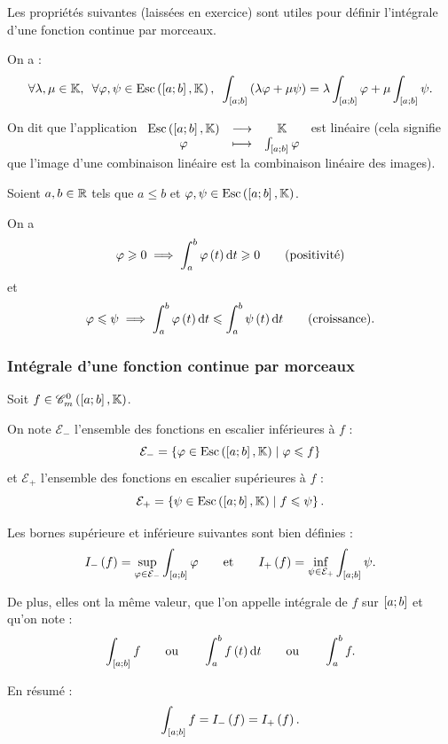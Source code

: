 \begin{rem}
Les propriétés suivantes (laissées en exercice) sont utiles pour définir l'intégrale d'une fonction continue par morceaux.
\end{rem}

\begin{prop}
On a : \[\quantifs{\forall\lambda,\mu\in\K;\forall\phi,\psi\in\Esc}\int_{\intervii{a}{b}}\paren{\lambda\phi+\mu\psi}=\lambda\int_{\intervii{a}{b}}\phi+\mu\int_{\intervii{a}{b}}\psi.\]

On dit que l'application \(\fonctionlambda{\Esc}{\K}{\phi}{\int_{\intervii{a}{b}}\phi}\) est linéaire (cela signifie que l'image d'une combinaison linéaire est la combinaison linéaire des images).
\end{prop}

\begin{prop}
Soient \(a,b\in\mathbb{R}\) tels que \(a\leq b\) et \(\phi,\psi\in\Esc\).

On a \[\phi\geq0\imp\int_a^b\phi\paren{t}\odif{t}\geq0\qquad\text{(positivité)}\] et \[\phi\leq\psi\imp\int_a^b\phi\paren{t}\odif{t}\leq\int_a^b\psi\paren{t}\odif{t}\qquad\text{(croissance).}\]
\end{prop}

\subsubsection{Intégrale d'une fonction continue par morceaux}

\begin{deftheo}
\newcommand{\Em}{\mathcal{E}_-}
\newcommand{\Ep}{\mathcal{E}_+}
Soit \(f\in\contm\).

On note \(\Em\) l'ensemble des fonctions en escalier inférieures à \(f\) : \[\Em=\accol{\phi\in\Esc\tq\phi\leq f}\] et \(\Ep\) l'ensemble des fonctions en escalier supérieures à \(f\) : \[\Ep=\accol{\psi\in\Esc\tq f\leq\psi}.\]

Les bornes supérieure et inférieure suivantes sont bien définies : \[I_-\paren{f}=\sup_{\phi\in\Em}\int_{\intervii{a}{b}}\phi\qquad\text{et}\qquad I_+\paren{f}=\inf_{\psi\in\Ep}\int_{\intervii{a}{b}}\psi.\]

De plus, elles ont la même valeur, que l'on appelle intégrale de \(f\) sur \(\left[a;b\right]\) et qu'on note : \[\int_{\intervii{a}{b}}f\qquad\text{ou}\qquad\int_a^bf\paren{t}\odif{t}\qquad\text{ou}\qquad\int_a^bf.\]

En résumé : \[\int_{\left[a;b\right]}f=I_-\left(f\right)=I_+\left(f\right).\]
\end{deftheo}

